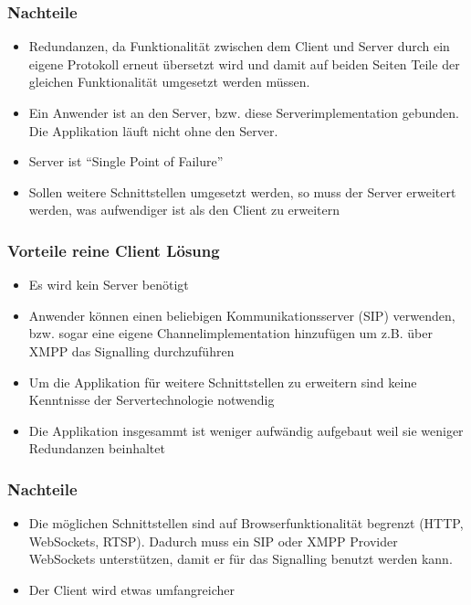 		\subsubsection{Nachteile}
		\begin{itemize}
			\item Redundanzen, da Funktionalität zwischen dem Client und Server durch ein eigene Protokoll erneut übersetzt wird und damit auf beiden Seiten Teile der gleichen Funktionalität umgesetzt werden müssen.
			\item Ein Anwender ist an den Server, bzw. diese Serverimplementation gebunden. Die Applikation läuft nicht ohne den Server.
			\item Server ist ``Single Point of Failure''
			\item Sollen weitere Schnittstellen umgesetzt werden, so muss der Server erweitert werden, was aufwendiger ist als den Client zu erweitern
		\end{itemize}


		\subsubsection{Vorteile reine Client Lösung}
		\begin{itemize}
			\item Es wird kein Server benötigt
			\item Anwender können einen beliebigen Kommunikationsserver (SIP) verwenden, bzw. sogar eine eigene Channelimplementation hinzufügen um z.B. über XMPP das Signalling durchzuführen
			\item Um die Applikation für weitere Schnittstellen zu erweitern sind keine Kenntnisse der Servertechnologie notwendig
			\item Die Applikation insgesammt ist weniger aufwändig aufgebaut weil sie weniger Redundanzen beinhaltet
		\end{itemize}
		\subsubsection{Nachteile}
		\begin{itemize}
			\item Die möglichen Schnittstellen sind auf Browserfunktionalität begrenzt (HTTP, WebSockets, RTSP). Dadurch muss ein SIP oder XMPP Provider WebSockets unterstützen, damit er für das Signalling benutzt werden kann.
			\item Der Client wird etwas umfangreicher
		\end{itemize}

